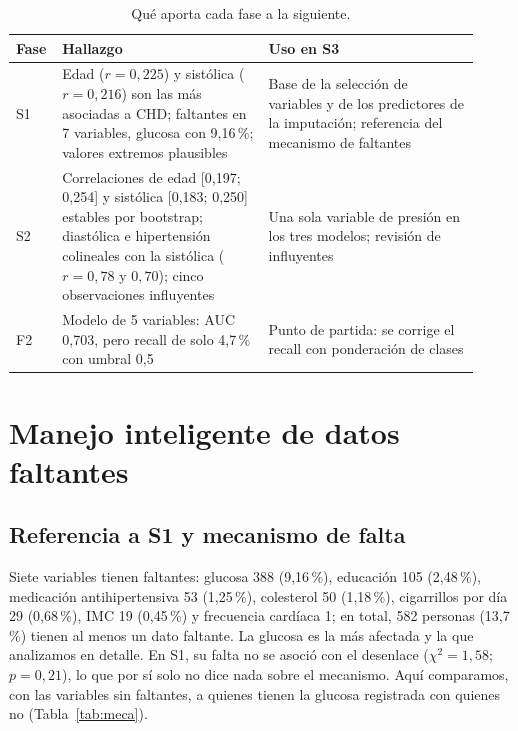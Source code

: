 \documentclass[11pt,a4paper]{article}
\begin{document}
\begin{table}[H]
\centering\small
\caption{Qué aporta cada fase a la siguiente.}\label{tab:prog}
\begin{tabular}{@{}p{0.07\linewidth}p{0.42\linewidth}p{0.43\linewidth}@{}}
\toprule
\textbf{Fase} & \textbf{Hallazgo} & \textbf{Uso en S3} \\
\midrule
S1 & Edad ($r=0,225$) y sistólica ($r=0,216$) son las más asociadas a CHD; faltantes en 7 variables, glucosa con 9,16\,\%; valores extremos plausibles & Base de la selección de variables y de los predictores de la imputación; referencia del mecanismo de faltantes \\
S2 & Correlaciones de edad [0,197; 0,254] y sistólica [0,183; 0,250] estables por bootstrap; diastólica e hipertensión colineales con la sistólica ($r=0,78$ y $0,70$); cinco observaciones influyentes & Una sola variable de presión en los tres modelos; revisión de influyentes \\
F2 & Modelo de 5 variables: AUC 0,703, pero recall de solo 4,7\,\% con umbral 0,5 & Punto de partida: se corrige el recall con ponderación de clases \\
\bottomrule
\end{tabular}
\end{table}

\section{Manejo inteligente de datos faltantes}
\subsection{Referencia a S1 y mecanismo de falta}
Siete variables tienen faltantes: glucosa 388 (9,16\,\%), educación 105 (2,48\,\%), medicación antihipertensiva 53 (1,25\,\%), colesterol 50 (1,18\,\%), cigarrillos por día 29 (0,68\,\%), IMC 19 (0,45\,\%) y frecuencia cardíaca 1; en total, 582 personas (13,7\,\%) tienen al menos un dato faltante. La glucosa es la más afectada y la que analizamos en detalle. En S1, su falta no se asoció con el desenlace ($\chi^2=1,58$; $p=0,21$), lo que por sí solo no dice nada sobre el mecanismo. Aquí comparamos, con las variables sin faltantes, a quienes tienen la glucosa registrada con quienes no (Tabla~\ref{tab:meca}).
\end{document}
